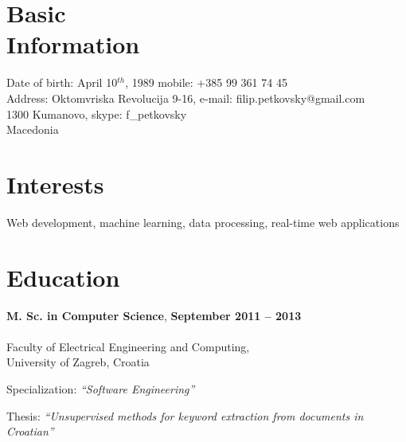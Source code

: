 \documentclass[margin,line]{resume}
\begin{document}
\begin{resume}

    \section{\mysidestyle Basic\\Information}

    Date of birth: April 10$^{th}$, 1989                \hfill mobile: +385 99 361 74 45          
    \vspace{0mm}\\
    \vspace{0mm}%
    Address: Oktomvriska Revolucija 9-16,               \hfill e-mail: filip.petkovsky@gmail.com 
    \\
    \vspace{0mm}%
    1300 Kumanovo,                                      \hfill skype: f\_petkovsky  
    \vspace{0mm} \\
    \vspace{0mm}%
    Macedonia 
    \vspace{0mm} \\
    \vspace{0mm}%
              
    \vspace{0mm} 
    
    \section{\mysidestyle Interests}

    Web development, machine learning, data processing, real-time web applications


    \section{\mysidestyle Education}

    \textbf{M. Sc. in Computer Science}, \hfill \textbf{ September 2011 -- 2013 }\vspace{-3mm}\\\vspace{-1mm}%
    \\Faculty of Electrical Engineering and Computing,\\
    University of Zagreb, Croatia \vspace{1mm}%
    \textsl{} 
    \begin{list2}
        \item Specialization: \textsl{``Software Engineering''} 
        \item Thesis: \textsl{``Unsupervised methods for keyword extraction from documents in Croatian''} 
    \end{list2}


\end{resume}
\end{document}

